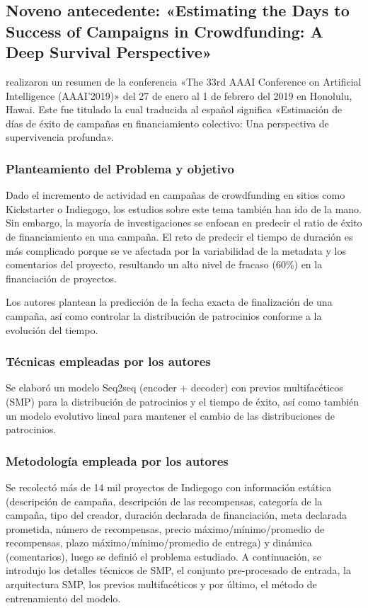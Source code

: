 \subsection{Noveno antecedente: «Estimating the Days to Success of Campaigns in Crowdfunding: A Deep Survival Perspective» \citep*{pr_jin2019dayssuccess}}
\citeauthor{pr_jin2019dayssuccess} realizaron un resumen de la conferencia «The 33rd AAAI Conference on Artificial Intelligence (AAAI'2019)» del 27 de enero al 1 de febrero del 2019 en Honolulu, Hawai. Este fue titulado  la cual traducida al español significa «Estimación de días de éxito de campañas en financiamiento colectivo: Una perspectiva de supervivencia profunda».

\subsubsection{Planteamiento del Problema y objetivo}
Dado el incremento de actividad en campañas de crowdfunding en sitios como Kickstarter o Indiegogo, los estudios sobre este tema también han ido de la mano. Sin embargo, la mayoría de investigaciones se enfocan en predecir el ratio de éxito de financiamiento en una campaña. El reto de predecir el tiempo de duración es más complicado porque se ve afectada por la variabilidad de la metadata y los comentarios del proyecto, resultando un alto nivel de fracaso (60\%) en la financiación de proyectos.

Los autores plantean la predicción de la fecha exacta de finalización de una campaña, así como controlar la distribución de patrocinios conforme a la evolución del tiempo.

\subsubsection{Técnicas empleadas por los autores}
Se elaboró un modelo Seq2seq (encoder + decoder) con previos multifacéticos (SMP) para la distribución de patrocinios y el tiempo de éxito, así como también un modelo evolutivo lineal para mantener el cambio de las distribuciones de patrocinios.

\subsubsection{Metodología empleada por los autores}
Se recolectó más de 14 mil proyectos de Indiegogo con información estática (descripción de campaña, descripción de las recompensas, categoría de la campaña, tipo del creador, duración declarada de financiación, meta declarada prometida, número de recompensas, precio máximo/mínimo/promedio de recompensas, plazo máximo/mínimo/promedio de entrega) y dinámica (comentarios), luego se definió el problema estudiado. A continuación, se introdujo los detalles técnicos de SMP, el conjunto pre-procesado de entrada, la arquitectura SMP, los previos multifacéticos y por último, el método de entrenamiento del modelo.

